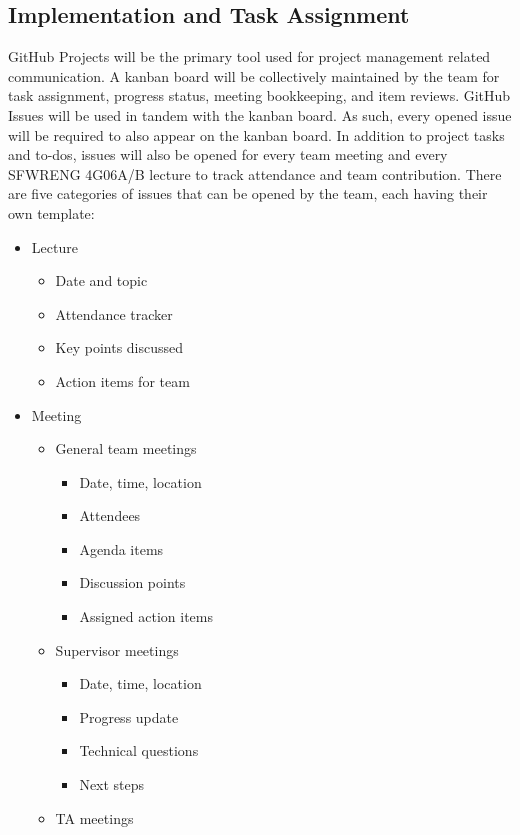 \documentclass{article}
\begin{document}
\subsection{Implementation and Task Assignment}
GitHub Projects will be the primary tool used for project management related communication. A kanban board will be collectively
maintained by the team for task assignment, progress status, meeting bookkeeping, and item reviews. 
GitHub Issues will be used in tandem with the kanban board. As such, every opened issue will be required to also 
appear on the kanban board. In addition to project tasks and to-dos, issues will also be opened for every team meeting and 
every SFWRENG 4G06A/B lecture to track attendance and team contribution. There are five categories of issues that can be 
opened by the team, each having their own template: 
\begin{itemize}
  \item Lecture
  \begin{itemize}
    \item Date and topic
    \item Attendance tracker
    \item Key points discussed
    \item Action items for team
  \end{itemize}
  \item Meeting
  \begin{itemize}
    \item General team meetings
      \begin{itemize}
        \item Date, time, location
        \item Attendees
        \item Agenda items
        \item Discussion points
        \item Assigned action items
      \end{itemize}
    \item Supervisor meetings
      \begin{itemize}
        \item Date, time, location
        \item Progress update
        \item Technical questions
        \item Next steps
      \end{itemize}
    \item TA meetings
      \begin{itemize}

\end{itemize}
\end{itemize}
\end{itemize}
\end{document}
